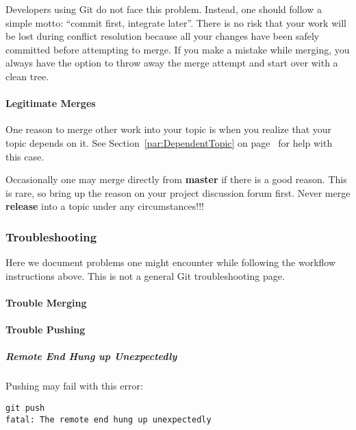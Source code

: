Developers using Git do not face this problem. Instead, one should follow a
simple motto: ``commit first, integrate later''. There is no risk that your work
will be lost during conflict resolution because all your changes have been
safely committed before attempting to merge. If you make a mistake while merging,
you always have the option to throw away the merge attempt and start over with a
clean tree.


\paragraph{Legitimate Merges}
\label{par:LegitimateMerges}

One reason to merge other work into your topic is when you realize that your
topic depends on it. See Section~\ref{par:DependentTopic} on
page~\pageref{par:DependentTopic} for help with this case.

Occasionally one may merge directly from \textbf{master} if there is a good
reason. This is rare, so bring up the reason on your project discussion forum
first. Never merge \textbf{release} into a topic under any circumstances!!!


\subsubsection{Troubleshooting}
\label{subsubsec:Troubleshooting}

Here we document problems one might encounter while following the workflow
instructions above. This is not a general Git troubleshooting page.

\paragraph{Trouble Merging}
\label{par:TroubleMerging}


\paragraph{Trouble Pushing}
\label{par:TroublePushing}

\subparagraph{Remote End Hung up Unexpectedly}
\label{subpar:RemoteEndHungUpUnexpectedly}

Pushing may fail with this error:

\begin{verbatim}
git push
fatal: The remote end hung up unexpectedly
\end{verbatim}

